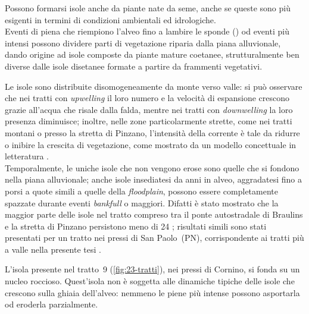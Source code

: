 Possono formarsi isole anche da piante nate da seme, anche se queste sono più esigenti in termini di condizioni ambientali ed idrologiche.
\\
Eventi di piena che riempiono l'alveo fino a lambire le sponde (\bankfull{}) od eventi più intensi possono dividere parti di vegetazione riparia dalla piana alluvionale, dando origine ad isole composte da piante mature coetanee, strutturalmente ben diverse dalle isole disetanee formate a partire da frammenti vegetativi.

Le isole sono distribuite disomogeneamente da monte verso valle: si può osservare che nei tratti con \emph{upwelling} il loro numero e la velocità di espansione crescono grazie all'acqua che risale dalla falda, mentre nei tratti con \emph{downwelling} la loro presenza diminuisce;
inoltre, nelle zone particolarmente strette, come nei tratti montani o presso la stretta di Pinzano, l'intensità della corrente è tale da ridurre o inibire la crescita di vegetazione, come mostrato da un modello concettuale in letteratura .
\\
Temporalmente, le uniche isole che non vengono erose sono quelle che si fondono nella piana alluvionale; anche isole insediatesi da anni in alveo, aggradatesi fino a porsi a quote simili a quelle della \emph{floodplain}, possono essere completamente spazzate durante eventi \emph{bankfull} o maggiori.
Difatti è stato mostrato che la maggior parte delle isole nel tratto compreso tra il ponte autostradale di Braulins e la stretta di Pinzano persistono meno di \SI{24}{\anni} ; risultati simili sono stati presentati per un tratto nei pressi di San Paolo~(PN), corrispondente ai tratti più a valle nella presente tesi .

L'isola presente nel tratto~9 (\cref{fig:23-tratti}), nei pressi di Cornino, si fonda su un nucleo roccioso.
Quest'isola non è soggetta alle dinamiche tipiche delle isole che crescono sulla ghiaia dell'alveo: nemmeno le piene più intense possono asportarla od eroderla parzialmente.


